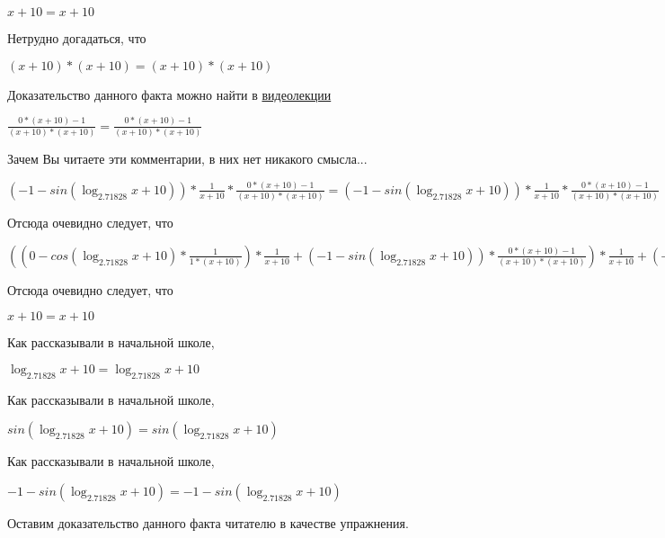 \documentclass[12pt,a4paper,fleqn]{article}
\theoremstyle{definition}
\begin{document}
$ x  +  10  =  x  +  10 $

Нетрудно догадаться, что

$( x  +  10 ) * ( x  +  10 ) = ( x  +  10 ) * ( x  +  10 )$

Доказательство данного факта можно найти в \href{https://www.youtube.com/watch?v=dQw4w9WgXcQ}{видеолекции}

$\frac{ 0  * ( x  +  10 ) -  1 }{( x  +  10 ) * ( x  +  10 )}
 = \frac{ 0  * ( x  +  10 ) -  1 }{( x  +  10 ) * ( x  +  10 )}
$

Зачем Вы читаете эти комментарии, в них нет никакого смысла...

$( -1  - sin(\log_{ 2.71828 }{ x  +  10 })) * \frac{ 1 }{ x  +  10 }
 * \frac{ 0  * ( x  +  10 ) -  1 }{( x  +  10 ) * ( x  +  10 )}
 = ( -1  - sin(\log_{ 2.71828 }{ x  +  10 })) * \frac{ 1 }{ x  +  10 }
 * \frac{ 0  * ( x  +  10 ) -  1 }{( x  +  10 ) * ( x  +  10 )}
$

Отсюда очевидно следует, что

$(( 0  - cos(\log_{ 2.71828 }{ x  +  10 }) * \frac{ 1 }{ 1  * ( x  +  10 )}
) * \frac{ 1 }{ x  +  10 }
 + ( -1  - sin(\log_{ 2.71828 }{ x  +  10 })) * \frac{ 0  * ( x  +  10 ) -  1 }{( x  +  10 ) * ( x  +  10 )}
) * \frac{ 1 }{ x  +  10 }
 + ( -1  - sin(\log_{ 2.71828 }{ x  +  10 })) * \frac{ 1 }{ x  +  10 }
 * \frac{ 0  * ( x  +  10 ) -  1 }{( x  +  10 ) * ( x  +  10 )}
 = (( 0  - cos(\log_{ 2.71828 }{ x  +  10 }) * \frac{ 1 }{ 1  * ( x  +  10 )}
) * \frac{ 1 }{ x  +  10 }
 + ( -1  - sin(\log_{ 2.71828 }{ x  +  10 })) * \frac{ 0  * ( x  +  10 ) -  1 }{( x  +  10 ) * ( x  +  10 )}
) * \frac{ 1 }{ x  +  10 }
 + ( -1  - sin(\log_{ 2.71828 }{ x  +  10 })) * \frac{ 1 }{ x  +  10 }
 * \frac{ 0  * ( x  +  10 ) -  1 }{( x  +  10 ) * ( x  +  10 )}
$

Отсюда очевидно следует, что

$ x  +  10  =  x  +  10 $

Как рассказывали в начальной школе,

$\log_{ 2.71828 }{ x  +  10 } = \log_{ 2.71828 }{ x  +  10 }$

Как рассказывали в начальной школе,

$sin(\log_{ 2.71828 }{ x  +  10 }) = sin(\log_{ 2.71828 }{ x  +  10 })$

Как рассказывали в начальной школе,

$ -1  - sin(\log_{ 2.71828 }{ x  +  10 }) =  -1  - sin(\log_{ 2.71828 }{ x  +  10 })$

Оставим доказательство данного факта читателю в качестве упражнения.
\end{document}
